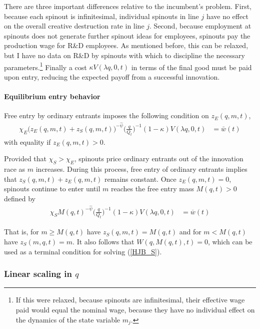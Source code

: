\documentclass[12pt,english]{article}
\theoremstyle{remark}
\begin{document}
There are three important differences relative to the incumbent's problem. First, because each spinout is infinitesimal, individual spinouts in line $j$ have no effect on the overall creative destruction rate in line $j$. Second, because employment at spinouts does not generate further spinout ideas for employees, spinouts pay the production wage for R\&D employees. As mentioned before, this can be relaxed, but I have no data on R\&D by spinouts with which to discipline the necessary parameters.\footnote{If this were relaxed, because spinouts are infinitesimal, their effective wage paid would equal the nominal wage, because they have no individual effect on the dynamics of the state variable $m_j$.} Finally a cost $\kappa V(\lambda q, 0, t)$ in terms of the final good must be paid upon entry, reducing the expected payoff from a successful innovation. 

\paragraph{Equilibrium entry behavior}

Free entry by ordinary entrants imposes the following condition on $z_E(q,m,t)$, 
\begin{align}
\chi_E \big( z_E(q,m,t) + z_S(q,m,t) \big)^{-\hat{\psi}} \Big(\frac{q}{Q_t}\Big)^{-1}  (1-\kappa) V(\lambda q,0,t)  &= \bar{w}(t)\label{free_entry_entrants}
\end{align}
with equality if $z_E(q,m,t) > 0$. 

Provided that $\chi_S > \chi_E$, spinouts price ordinary entrants out of the innovation race as $m$ increases. During this process, free entry of ordinary entrants implies that $z_S(q,m,t) + z_E(q,m,t)$ remains constant. Once $z_E(q,m,t) = 0$, spinouts continue to enter until $m$ reaches the free entry mass $M(q,t) > 0$ defined by
\begin{align}
\chi_S  M(q,t)^{-\hat{\psi}}\Big(\frac{q}{Q_t}\Big)^{-1} (1-\kappa) V(\lambda q,0,t)  &= \overline{w}(t) \label{free_entry_spinouts}
\end{align}

That is, for $m \ge M(q,t)$ have $z_S(q,m,t) = M(q,t)$ and for $m < M(q,t)$ have $z_S(m,q,t) = m$. It also follows that $W(q,M(q,t),t) = 0$, which can be used as a terminal condition for solving (\ref{HJB_S}).


\subsubsection{Linear scaling in $q$}
\end{document}
